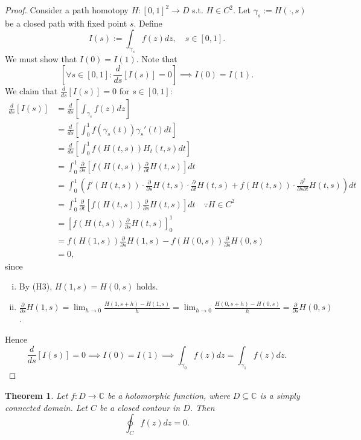 \documentclass[12pt,openany]{book}
\newtheorem{theorem}{Theorem}[chapter]
\theoremstyle{definition}
\newcommand{\C}{\mathbb{C}}
\newcommand{\of}[1]{\left( #1 \right)}
\begin{document}
	\begin{proof}
		Consider a path homotopy $H:[0,1]^2\to D$ s.t. $H\in C^2$. Let $\gamma_s:=H\of{\cdot, s}$ be a closed path with fixed point $s$. Define \[
		I\of{s}:=\int_{\gamma_s}f\of{z}dz,\quad s\in[0,1].
		\] We must show that $I(0)=I(1)$. Note that \[
		\left[\forall s\in[0,1]:\frac{d}{ds}\left[I(s)\right]=0\right]\implies I(0)=I(1).
		\] We claim that $\displaystyle\frac{d}{ds}\left[I(s)\right]=0$ for $s\in[0,1]$:
		\begin{align*}
		\frac{d}{ds}\left[I(s)\right]&=\frac{d}{ds}\left[\int_{\gamma_s}f\of{z}dz\right]\\
		&=\frac{d}{ds}\left[\int_0^1f\of{\gamma_s\of{t}}\gamma_s'\of{t}dt\right]\\
		&=\frac{d}{ds}\left[\int_0^1f\of{H\of{t,s}}H_t\of{t,s}dt\right]\\
		&=\int_0^1\frac{\partial}{\partial s}\left[f\of{H\of{t,s}}\frac{\partial}{\partial t}H\of{t,s}\right]dt\\
		&=\int_0^1\left(f'\of{H(t,s)}\cdot \frac{\partial}{\partial s}H\of{t,s}\cdot \frac{\partial}{\partial t}H\of{t,s}+f\of{H(t,s)}\cdot \frac{\partial^2}{\partial s\partial t}H\of{t,s}\right)dt\\
		&=\int_0^1\frac{\partial}{\partial t}\left[f\of{H(t,s)}\frac{\partial }{\partial s}H\of{t,s}\right]dt\quad\because H\in C^2\\
		&=\left[f\of{H(t,s)}\frac{\partial }{\partial s}H\of{t,s}\right]_0^1\\
		&=f\of{H\of{1,s}}\frac{\partial}{\partial s}H\of{1,s}-f\of{H\of{0,s}}\frac{\partial}{\partial s}H\of{0,s}\\
		&=0,
		\end{align*} since \begin{enumerate}[(i)]
			\item By (H3), $H\of{1,s}=H\of{0,s}$ holds.
			\item $\displaystyle\frac{\partial}{\partial s}H\of{1,s}=\lim_{h\to 0}\frac{H\of{1,s+h}-H\of{1,s}}{h}=\lim_{h\to 0}\frac{H\of{0,s+h}-H\of{0,s}}{h}=\frac{\partial}{\partial s}H\of{0,s}$.
		\end{enumerate}
		Hence \[
		\frac{d}{ds}\left[I\of{s}\right]=0\implies I\of{0}=I\of{1}\implies
		\int_{\gamma_0}f\of{z}dz=\int_{\gamma_1}f\of{z}dz.
		\]
	\end{proof}
	\vspace{8pt}
	\begin{tcolorbox}[colback=white,colframe=thmcolor,arc=5pt,title={\color{white}\bf Cauchy-Goursat Theorem}]
		\begin{theorem}
			Let $f:D\to\C$ be a holomorphic function, where $D\subseteq\C$ is a simply connected domain. Let $C$ be a closed contour in $D$. Then \[
			\oint_C f\of{z}dz = 0.
			\]
		\end{theorem}
	\end{tcolorbox}
	
\end{document}
